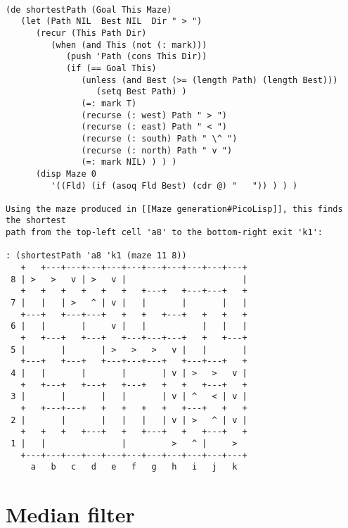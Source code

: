 \begin{verbatim}

(de shortestPath (Goal This Maze)
   (let (Path NIL  Best NIL  Dir " > ")
      (recur (This Path Dir)
         (when (and This (not (: mark)))
            (push 'Path (cons This Dir))
            (if (== Goal This)
               (unless (and Best (>= (length Path) (length Best)))
                  (setq Best Path) )
               (=: mark T)
               (recurse (: west) Path " > ")
               (recurse (: east) Path " < ")
               (recurse (: south) Path " \^ ")
               (recurse (: north) Path " v ")
               (=: mark NIL) ) ) )
      (disp Maze 0
         '((Fld) (if (asoq Fld Best) (cdr @) "   ")) ) ) )

Using the maze produced in [[Maze generation#PicoLisp]], this finds the shortest
path from the top-left cell 'a8' to the bottom-right exit 'k1':

: (shortestPath 'a8 'k1 (maze 11 8))
   +   +---+---+---+---+---+---+---+---+---+---+
 8 | >   >   v | >   v |                       |
   +   +   +   +   +   +   +---+   +---+---+   +
 7 |   |   | >   ^ | v |   |       |       |   |
   +---+   +---+---+   +   +   +---+   +   +   +
 6 |   |       |     v |   |           |   |   |
   +   +---+   +---+   +---+---+---+   +   +---+
 5 |       |       | >   >   >   v |   |       |
   +---+   +---+   +---+---+---+   +---+---+   +
 4 |   |       |       |       | v | >   >   v |
   +   +---+   +---+   +---+   +   +   +---+   +
 3 |       |       |   |       | v | ^   < | v |
   +   +---+---+   +   +   +   +   +---+   +   +
 2 |       |       |   |   |   | v | >   ^ | v |
   +   +   +   +---+   +   +---+   +   +---+   +
 1 |   |               |         >   ^ |     >
   +---+---+---+---+---+---+---+---+---+---+---+
     a   b   c   d   e   f   g   h   i   j   k

\end{verbatim}

\section*{Median filter}

